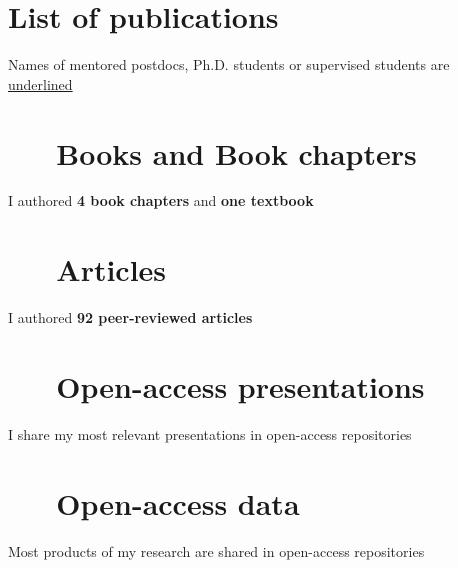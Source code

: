 \documentclass[%
               doublesided,
               paper=a4,
               fontsize=10pt
              ]{my-resume}
\begin{document}
\clearpage

\pagestyle{empty}

\section[\faAreaChart]{List of publications}
Names of mentored postdocs, Ph.D. students or supervised students are \underline{underlined}

\nocite{*}
\section{\faBook \ \ \ Books and Book chapters}
I authored \textbf{4 book chapters} and \textbf{one textbook}
\printbibliography[type=book,heading=none]
\section{\faFileTextO \ \ \  Articles}
I authored \textbf{92 peer-reviewed articles}
\printbibliography[type=article,heading=none]
\section{\faFileTextO \ \ \  Open-access presentations}
I share my most relevant presentations in open-access repositories 
\printbibliography[type=misc,heading=none]
\section{\faFileTextO \ \ \  Open-access data}
Most products of my research are shared in open-access repositories
\printbibliography[type=dataset,heading=none]


\end{document}
